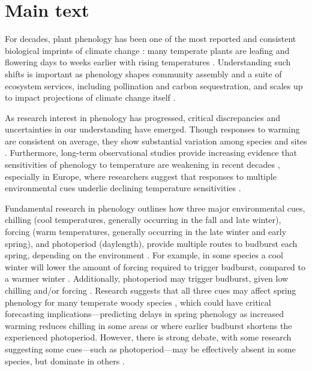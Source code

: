\documentclass{article}
\begin{document}
\section* {Main text}

\par For decades, plant phenology has been one of the most reported and consistent biological imprints of climate change \emph{\citep{IPCC:2014sm}}: many temperate plants are leafing and flowering days to weeks earlier with rising temperatures \emph{\citep{millerrushing2008,menzel2006}}. Understanding such shifts is important as phenology shapes community assembly and a suite of ecosystem services, including pollination and carbon sequestration, and scales up to impact projections of climate change itself \emph{\citep{Cleland:2007or}}.
\par As research interest in phenology has progressed, critical discrepancies and uncertainties in our understanding have emerged. Though responses to warming are consistent on average, they show substantial variation among species and sites \emph{\citep{Wolkovich:2012n}}. Furthermore, long-term observational studies provide increasing evidence that sensitivities of phenology to temperature are weakening in recent decades \emph{\citep{Rutishauser:2008,yu2010,wang2019}}, especially in Europe, where researchers suggest that responses to multiple environmental cues underlie declining temperature sensitivities \emph{\citep{fu2015}}.

\par Fundamental research in phenology outlines how three major environmental cues, chilling (cool temperatures, generally occurring in the fall and late winter), forcing (warm temperatures, generally occurring in the late winter and early spring), and photoperiod (daylength), provide multiple routes to budburst each spring, depending on the environment \emph{\citep{chuine2016}}. For example, in some species a cool winter will lower the amount of forcing required to trigger budburst, compared to a warmer winter \emph{\citep{harrington2015}}. Additionally, photoperiod may trigger budburst, given low chilling and/or forcing \emph{\citep{zohner2016,Basler:2014aa, Caffarra:2011b}}. Research suggests that all three cues may affect spring phenology for many temperate woody species \emph{\citep{flynn2018,Basler:2014aa,Caffarra:2011qf}}, which could have critical forecasting implications---predicting delays in spring phenology as increased warming reduces chilling in some areas \emph{\citep{fraga2019}} or where earlier budburst shortens the experienced photoperiod. However, there is strong debate, with some research suggesting some cues---such as photoperiod---may be effectively absent in some species, but dominate in others \emph{\citep{zohner2016,Heide:1993,Basler:2014aa,Singh:2017}}. 
\end{document}
